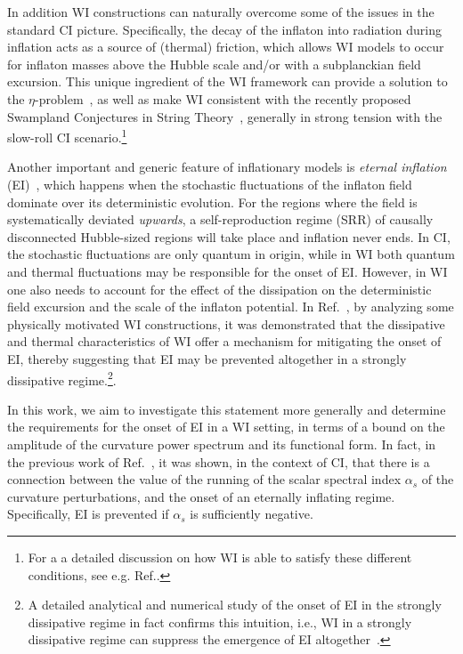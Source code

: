 In addition WI constructions can naturally overcome some of the issues in the standard CI picture. Specifically, the decay of the inflaton into radiation during inflation acts as a source of (thermal) friction, which allows
WI models to occur for inflaton masses above the Hubble scale and/or with a subplanckian field excursion. This unique ingredient of the WI framework can provide a solution to the
$\eta$-problem~\cite{Bastero-Gil:2019gao}, as well as make WI
consistent with the recently proposed Swampland Conjectures in String
Theory~\cite{Das:2018hqy,Motaharfar:2018zyb,Das:2018rpg,Das:2019hto,Kamali:2019xnt,Brandenberger:2020oav,Das:2020xmh}, generally in strong
tension with the slow-roll CI scenario.\footnote{For a a detailed discussion on how WI is able to satisfy these different conditions, see e.g. Ref.\cite{Berera:2023liv}. }

Another important and generic feature of inflationary models is \textit{eternal inflation}
(EI)~\cite{Vilenkin:1983xq,Guth:1985ya,Linde:1986fc,Linde:1986fd,Starobinsky:1986fx},
which happens when the stochastic fluctuations of the inflaton field
dominate over its deterministic evolution. {}For the regions where the
field is systematically deviated {\it upwards},   a self-reproduction
regime (SRR) of causally disconnected Hubble-sized regions will take
place and inflation never ends. In CI, the stochastic fluctuations are
only quantum in origin, while in WI both quantum and thermal
fluctuations may be responsible for the onset of EI. However, in WI
one also needs to account for the effect of the dissipation on the
deterministic field excursion and the scale of the inflaton
potential. In Ref.~\cite{Vicente:2015hga}, by analyzing some physically motivated WI constructions, it was demonstrated  that the dissipative and thermal characteristics of WI offer a mechanism for mitigating the onset of EI,
thereby suggesting that EI may be prevented altogether in a strongly dissipative regime.\footnote{A detailed analytical and numerical study of the onset of EI in the strongly dissipative regime in fact confirms this intuition, i.e., WI in a strongly dissipative regime can suppress the emergence of EI altogether~\cite{MRVFeistudy}.}.

In this work, we aim to investigate this statement more generally and determine the requirements for the onset of EI in a WI setting, in terms of a bound on the amplitude of the curvature power spectrum and its functional form. In fact, in the previous work of Ref.~\cite{Kinney:2014jya}, it was shown, in
the context of CI, that there is a connection between the value of the
running of the scalar spectral index $\alpha_s$ of the curvature
perturbations, and the onset of an eternally inflating regime.  Specifically, EI is prevented if
$\alpha_s$ is sufficiently negative.

